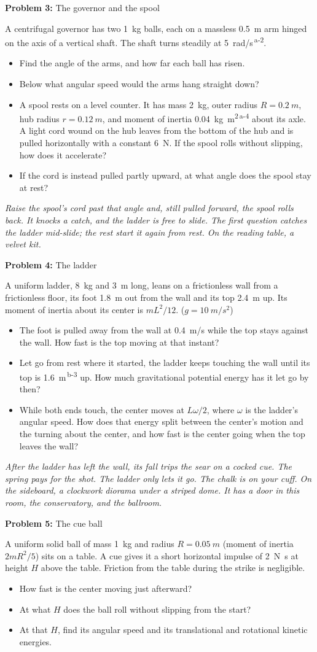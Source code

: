 \documentclass[11pt]{article}
\newcommand{\room}[1]{\par\bigskip{\large\bfseries #1}\par\nopagebreak\smallskip}
\newcommand{\scene}[1]{\par{\itshape #1}\par}
\newcommand{\problem}[2]{\par\medskip\textbf{Problem #1:} #2\par\nopagebreak}
\newenvironment{parts}{\begin{itemize}[leftmargin=3.4em,labelwidth=2.8em,labelsep=0.6em,align=left,itemsep=3pt,topsep=4pt]}{\end{itemize}}
\newcommand{\pt}[1]{\item[\textbf{#1}]}
\newcommand{\sv}[1]{\textsuperscript{\dag\,#1}}
\begin{document}
\problem{3}{The governor and the spool}
A centrifugal governor has two \SI{1}{kg} balls, each on a massless \SI{0.5}{m} arm hinged on the axis of a vertical shaft. The shaft turns steadily at \SI{5}{rad/s}\sv{a-2}.
\begin{parts}
\pt{3-a} Find the angle of the arms, and how far each ball has risen.
\pt{3-b} Below what angular speed would the arms hang straight down?
\pt{3-c} A spool rests on a level counter. It has mass \SI{2}{kg}, outer radius $R = \SI{0.2}{m}$, hub radius $r = \SI{0.12}{m}$, and moment of inertia \SI{0.04}{kg.m^2}\sv{a-4} about its axle. A light cord wound on the hub leaves from the bottom of the hub and is pulled horizontally with a constant \SI{6}{N}. If the spool rolls without slipping, how does it accelerate?
\pt{3-d} If the cord is instead pulled partly upward, at what angle does the spool stay at rest?
\end{parts}

\room{Library}
\scene{Raise the spool's cord past that angle and, still pulled forward, the spool rolls back. It knocks a catch, and the ladder is free to slide. The first question catches the ladder mid-slide; the rest start it again from rest. On the reading table, a velvet kit.}
\problem{4}{The ladder}
A uniform ladder, \SI{8}{kg} and \SI{3}{m} long, leans on a frictionless wall from a frictionless floor, its foot \SI{1.8}{m} out from the wall and its top \SI{2.4}{m} up. Its moment of inertia about its center is $mL^2/12$. ($g = \SI{10}{m/s^2}$)
\begin{parts}
\pt{4-a} The foot is pulled away from the wall at \SI{0.4}{m/s} while the top stays against the wall. How fast is the top moving at that instant?
\pt{4-b} Let go from rest where it started, the ladder keeps touching the wall until its top is \SI{1.6}{m}\sv{b-3} up. How much gravitational potential energy has it let go by then?
\pt{4-c} While both ends touch, the center moves at $L\omega/2$, where $\omega$ is the ladder's angular speed. How does that energy split between the center's motion and the turning about the center, and how fast is the center going when the top leaves the wall?
\end{parts}

\clearpage
\room{Billiard room}
\scene{After the ladder has left the wall, its fall trips the sear on a cocked cue. The spring pays for the shot. The ladder only lets it go. The chalk is on your cuff. On the sideboard, a clockwork diorama under a striped dome. It has a door in this room, the conservatory, and the ballroom.}
\problem{5}{The cue ball}
A uniform solid ball of mass \SI{1}{kg} and radius $R = \SI{0.05}{m}$ (moment of inertia $2mR^2/5$) sits on a table. A cue gives it a short horizontal impulse of \SI{2}{N.s} at height $H$ above the table. Friction from the table during the strike is negligible.
\begin{parts}
\pt{5-a} How fast is the center moving just afterward?
\pt{5-b} At what $H$ does the ball roll without slipping from the start?
\pt{5-c} At that $H$, find its angular speed and its translational and rotational kinetic energies.
\end{parts}
\end{document}
